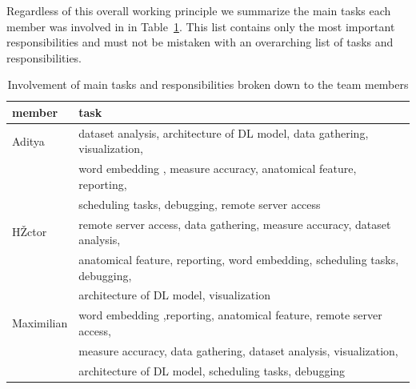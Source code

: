 \documentclass[a4paper,11pt]{article}
\begin{document}
Regardless of this overall working principle we summarize the main tasks each member was involved in in Table~\ref{tab:roles}. This list contains only the most important responsibilities and must not be mistaken with an overarching list of tasks and responsibilities.

\begin{table}[h!]
\centering
 \begin{tabular}{l |l}
 member 		& task \\ \hline
 Aditya		&  dataset analysis, architecture of DL model, data gathering, visualization, \\ 
 			& word embedding , measure accuracy, anatomical feature, reporting,  \\
			& scheduling tasks, debugging, remote server access\\ \hline
 HŽctor 		&  remote server access, data gathering, measure accuracy, dataset analysis,\\
 			& anatomical feature, reporting, word embedding, scheduling tasks, debugging, \\
			& architecture of DL model, visualization\\ \hline
 Maximilian 	& word embedding ,reporting, anatomical feature, remote server access,\\
 			& measure accuracy, data gathering, dataset analysis, visualization, \\
			& architecture of DL model, scheduling tasks, debugging
 \end{tabular}
 \captionsetup{justification=centering,margin=2cm}
 \caption{Involvement of main tasks and responsibilities broken down to the team members}
 \label{tab:roles}
\end{table}

\end{document}
